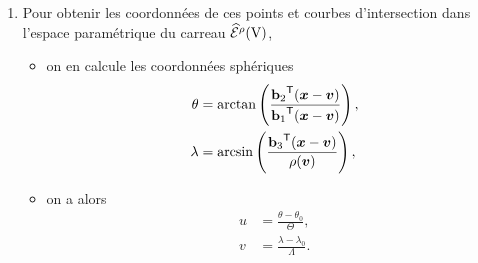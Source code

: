 \begin{enumerate}
\begin{enumerate}
    	\item Pour obtenir les coordonnées de ces points et courbes d'intersection dans l'espace paramétrique du carreau $\pseudoEdS{\brepvertex}{\rho}$,
    	\begin{itemize}
    		\item on en calcule les coordonnées sphériques
    		\begin{align}
			    \theta &= \arctan \left( 
			        \frac{
			            {\mathbf{b}_2} ^\mathsf{T} {\left(\bm{x} - \bm{v}\right)}
			        }{
			            {\mathbf{b}_1} ^\mathsf{T} {\left(\bm{x} - \bm{v}\right)}
			        }
			    \right), \\
			    \lambda &= \arcsin \left( 
			        \frac{
			            {\mathbf{b}_3} ^\mathsf{T} {\left(\bm{x} - \bm{v}\right)}
			        }{
			            \rho(\bm{v})
			        }
			    \right),
			\end{align} 
			\item on a alors
			\begin{align}
			    u &= \frac{\theta - \theta_0}{\Theta}, \\
			    v &= \frac{\lambda - \lambda_0}{\Lambda}.
			\end{align} 
    	\end{itemize}
    \end{enumerate}
    
\end{enumerate}











